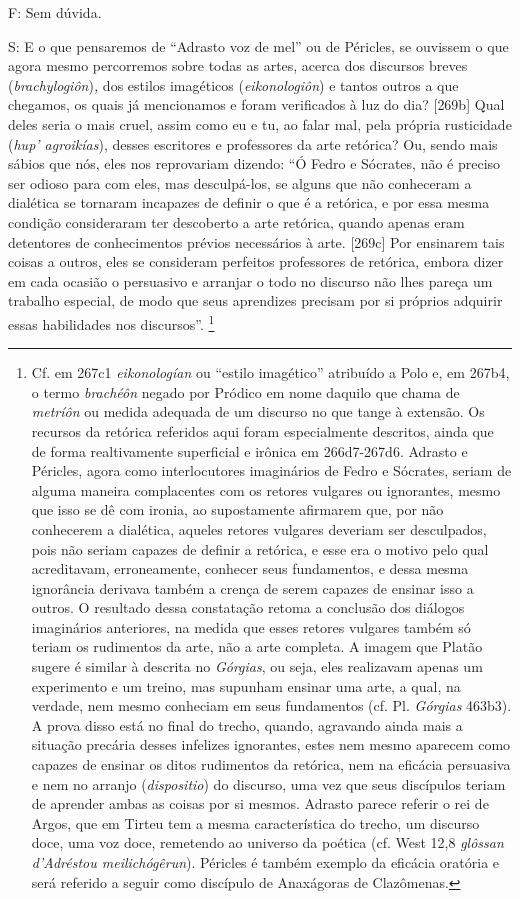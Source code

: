 F: Sem dúvida.

S: E o que pensaremos de ``Adrasto voz de mel'' ou de Péricles, se
ouvissem o que agora mesmo percorremos sobre todas as artes, acerca dos
discursos breves (\emph{brachylogiôn})\emph{,} dos estilos imagéticos
(\emph{eikonologiôn}) e tantos outros a que chegamos, os quais já
mencionamos e foram verificados à luz do dia? {[}269b{]} Qual deles
seria o mais cruel, assim como eu e tu, ao falar mal, pela própria
rusticidade (\emph{hup' agroikías}), desses escritores e professores da
arte retórica? Ou, sendo mais sábios que nós, eles nos reprovariam
dizendo: ``Ó Fedro e Sócrates, não é preciso ser odioso para com eles,
mas desculpá-los, se alguns que não conheceram a dialética se tornaram
incapazes de definir o que é a retórica, e por essa mesma condição
consideraram ter descoberto a arte retórica, quando apenas eram
detentores de conhecimentos prévios necessários à arte. {[}269c{]} Por
ensinarem tais coisas a outros, eles se consideram perfeitos professores
de retórica, embora dizer em cada ocasião o persuasivo e arranjar o todo
no discurso não lhes pareça um trabalho especial, de modo que seus
aprendizes precisam por si próprios adquirir essas habilidades nos
discursos''. \footnote{Cf. em 267c1 \emph{eikonologían} ou ``estilo
  imagético'' atribuído a Polo e, em 267b4, o termo \emph{brachéôn}
  negado por Pródico em nome daquilo que chama de \emph{metríôn} ou
  medida adequada de um discurso no que tange à extensão. Os recursos da
  retórica referidos aqui foram especialmente descritos, ainda que de
  forma realtivamente superficial e irônica em 266d7-267d6. Adrasto e
  Péricles, agora como interlocutores imaginários de Fedro e Sócrates,
  seriam de alguma maneira complacentes com os retores vulgares ou
  ignorantes, mesmo que isso se dê com ironia, ao supostamente afirmarem
  que, por não conhecerem a dialética, aqueles retores vulgares deveriam
  ser desculpados, pois não seriam capazes de definir a retórica, e esse
  era o motivo pelo qual acreditavam, erroneamente, conhecer seus
  fundamentos, e dessa mesma ignorância derivava também a crença de
  serem capazes de ensinar isso a outros. O resultado dessa constatação
  retoma a conclusão dos diálogos imaginários anteriores, na medida que
  esses retores vulgares também só teriam os rudimentos da arte, não a
  arte completa. A imagem que Platão sugere é similar à descrita no
  \emph{Górgias}, ou seja, eles realizavam apenas um experimento e um
  treino, mas supunham ensinar uma arte, a qual, na verdade, nem mesmo
  conheciam em seus fundamentos (cf. Pl. \emph{Górgias} 463b3). A prova
  disso está no final do trecho, quando, agravando ainda mais a situação
  precária desses infelizes ignorantes, estes nem mesmo aparecem como
  capazes de ensinar os ditos rudimentos da retórica, nem na eficácia
  persuasiva e nem no arranjo (\emph{dispositio}) do discurso, uma vez
  que seus discípulos teriam de aprender ambas as coisas por si mesmos.
  Adrasto parece referir o rei de Argos, que em Tirteu tem a mesma
  característica do trecho, um discurso doce, uma voz doce, remetendo ao
  universo da poética (cf. West 12,8 \emph{glôssan d'Adréstou
  meilichógêrun}). Péricles é também exemplo da eficácia oratória e será
  referido a seguir como discípulo de Anaxágoras de Clazômenas.}

